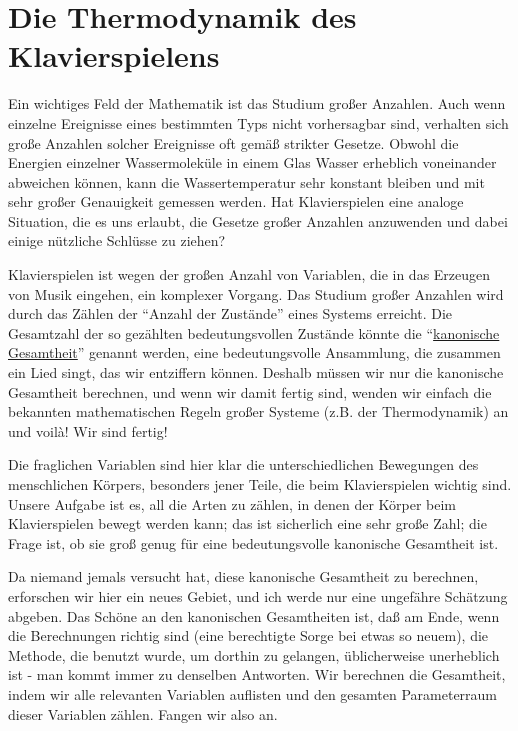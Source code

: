 
\section{Die Thermodynamik des Klavierspielens}\hypertarget{c1iv3}{}

Ein wichtiges Feld der Mathematik ist das Studium großer Anzahlen.
Auch wenn einzelne Ereignisse eines bestimmten Typs nicht vorhersagbar sind, verhalten sich große Anzahlen solcher Ereignisse oft gemäß strikter Gesetze.
Obwohl die Energien einzelner Wassermoleküle in einem Glas Wasser erheblich voneinander abweichen können, kann die Wassertemperatur sehr konstant bleiben und mit sehr großer Genauigkeit gemessen werden.
Hat Klavierspielen eine analoge Situation, die es uns erlaubt, die Gesetze großer Anzahlen anzuwenden und dabei einige nützliche Schlüsse zu ziehen?


\hypertarget{canonic}{}

Klavierspielen ist wegen der großen Anzahl von Variablen, die in das Erzeugen von Musik eingehen, ein komplexer Vorgang.
Das Studium großer Anzahlen wird durch das Zählen der \enquote{Anzahl der Zustände} eines Systems erreicht.
Die Gesamtzahl der so gezählten bedeutungsvollen Zustände könnte die \enquote{\hyperlink{ueb-canonic}{kanonische Gesamtheit}} genannt werden, eine bedeutungsvolle Ansammlung, die zusammen ein Lied singt, das wir entziffern können.
Deshalb müssen wir nur die kanonische Gesamtheit berechnen, und wenn wir damit fertig sind, wenden wir einfach die bekannten mathematischen Regeln großer Systeme (z.B. der Thermodynamik) an und voilà!
Wir sind fertig!

Die fraglichen Variablen sind hier klar die unterschiedlichen Bewegungen des menschlichen Körpers, besonders jener Teile, die beim Klavierspielen wichtig sind.
Unsere Aufgabe ist es, all die Arten zu zählen, in denen der Körper beim Klavierspielen bewegt werden kann; das ist sicherlich eine sehr große Zahl; die Frage ist, ob sie groß genug für eine bedeutungsvolle kanonische Gesamtheit ist.

Da niemand jemals versucht hat, diese kanonische Gesamtheit zu berechnen, erforschen wir hier ein neues Gebiet, und ich werde nur eine ungefähre Schätzung abgeben.
Das Schöne an den kanonischen Gesamtheiten ist, daß am Ende, wenn die Berechnungen richtig sind (eine berechtigte Sorge bei etwas so neuem), die Methode, die benutzt wurde, um dorthin zu gelangen, üblicherweise unerheblich ist - man kommt immer zu denselben Antworten.
Wir berechnen die Gesamtheit, indem wir alle relevanten Variablen auflisten und den gesamten Parameterraum dieser Variablen zählen.
Fangen wir also an.


